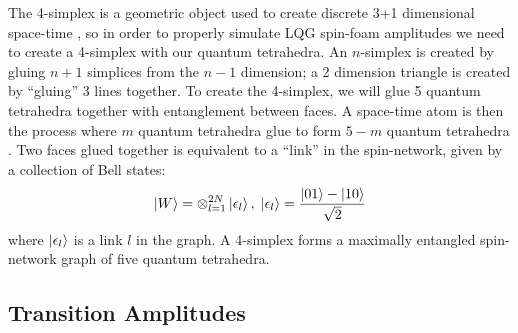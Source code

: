 \documentclass[a4paper,11pt,aps,tightenlines,nofootinbib]{revtex4}
\begin{document}
        The 4-simplex is a geometric object used to create discrete 3+1 dimensional space-time \cite{simplical-decomp}, so in order to 
        properly simulate LQG spin-foam amplitudes we need to create a 4-simplex with our quantum tetrahedra.
        An $n$-simplex is created by gluing $n+1$ simplices from the $n-1$ dimension; a 2 dimension triangle is created by ``gluing'' 3 lines 
        together. To create the 4-simplex, we will glue 5 quantum tetrahedra together with entanglement between faces. 
        A space-time atom is then the process where $m$ quantum tetrahedra glue to form $5-m$ quantum tetrahedra \cite{covariant-lqg}. Two faces glued together 
        is equivalent to a ``link'' in the spin-network, given by a collection of Bell states:
        \begin{equation}
                \ket{W} = \otimes_{l=1}^{2N} \ket{\epsilon_l}, \; \ket{\epsilon_l} = \frac{\ket{01}-\ket{10}}{\sqrt{2}}
        \end{equation}
        where $\ket{\epsilon_l}$ is a link $l$ in the graph. A 4-simplex forms a maximally entangled spin-network graph of five quantum tetrahedra. 


\subsection{Transition Amplitudes}

\end{document}
